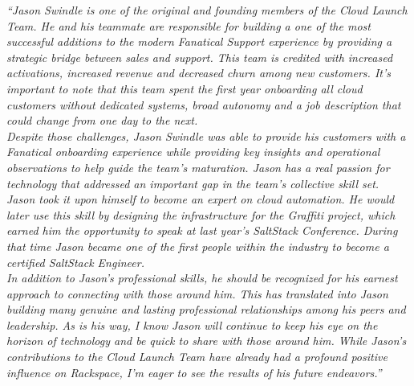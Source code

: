 \setlength\parindent{2em} \textit{
``Jason Swindle is one of the original and founding members of the Cloud Launch Team. He and his teammate are responsible for building a one of the most successful additions to the modern Fanatical Support experience by providing a strategic bridge between sales and support.  This team is credited with increased activations, increased revenue and decreased churn among new customers.  It’s important to note that this team spent the first year onboarding all cloud customers without dedicated systems, broad autonomy and a job description that could change from one day to the next.} \\[5pt]

\setlength\parindent{2em} \textit{
Despite those challenges, Jason Swindle was able to provide his customers with a Fanatical onboarding experience while providing key insights and operational observations to help guide the team’s maturation.  Jason has a real passion for technology that addressed an important gap in the team’s collective skill set. Jason took it upon himself to become an expert on cloud automation. He would later use this skill by designing the infrastructure for the Graffiti project, which earned him the opportunity to speak at last year’s SaltStack Conference. During that time Jason became one of the first people within the industry to become a certified SaltStack Engineer.} \\[5pt]

\setlength\parindent{2em} \textit{
In addition to Jason’s professional skills, he should be recognized for his earnest approach to connecting with those around him. This has translated into Jason building many genuine and lasting professional relationships among his peers and leadership.  As is his way, I know Jason will continue to keep his eye on the horizon of technology and be quick to share with those around him. While Jason’s contributions to the Cloud Launch Team have already had a profound positive influence on Rackspace, I’m eager to see the results of his future endeavors.''}
  \leavevmode \\[10pt]